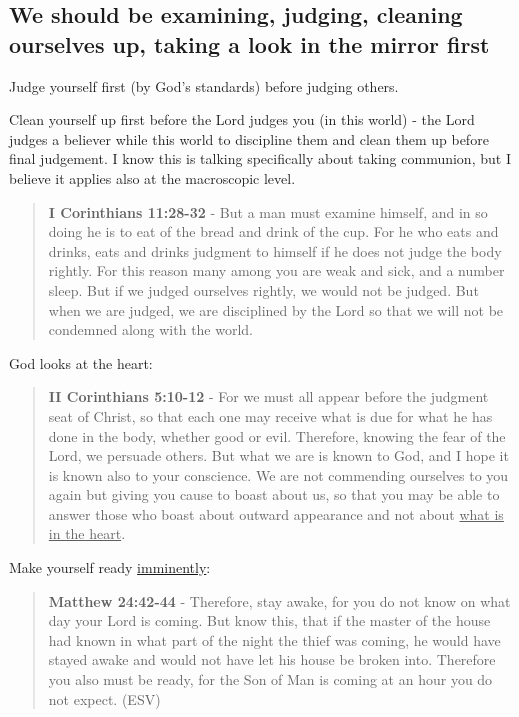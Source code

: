 \documentclass[11pt]{article}
\begin{document}
\subsection{We should be examining, judging, cleaning ourselves up, taking a look in the mirror first}
\label{sec:org9b6673d}
Judge yourself first (by God's standards) before judging others.

Clean yourself up first before the Lord judges you (in this world) - the Lord judges a believer while this world to discipline them and clean them up before final judgement.
I know this is talking specifically about taking communion, but I believe it applies also at the macroscopic level.

\begin{quote}
\textbf{I Corinthians 11:28-32} - But a man must examine himself, and in so doing he is to eat of the bread and drink of the cup.  For he who eats and drinks, eats and drinks judgment to himself if he does not judge the body rightly.  For this reason many among you are weak and sick, and a number sleep.  But if we judged ourselves rightly, we would not be judged.  But when we are judged, we are disciplined by the Lord so that we will not be condemned along with the world.
\end{quote}

God looks at the heart:

\begin{quote}
\textbf{II Corinthians 5:10-12} - For we must all appear before the judgment seat of Christ, so that each one may receive what is due for what he has done in the body, whether good or evil. Therefore, knowing the fear of the Lord, we persuade others. But what we are is known to God, and I hope it is known also to your conscience. We are not commending ourselves to you again but giving you cause to boast about us, so that you may be able to answer those who boast about outward appearance and not about \uline{what is in the heart}.
\end{quote}

Make yourself ready \uline{imminently}:

\begin{quote}
\textbf{Matthew 24:42-44} - Therefore, stay awake, for you do not know on what day your Lord is coming. But know this, that if the master of the house had known in what part of the night the thief was coming, he would have stayed awake and would not have let his house be broken into. Therefore you also must be ready, for the Son of Man is coming at an hour you do not expect. (ESV)
\end{quote}
\end{document}
